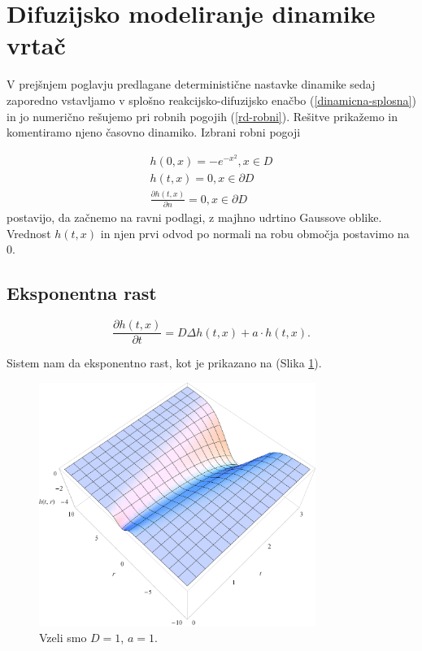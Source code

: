 \documentclass[a4paper, twoside, 12pt]{book}
\begin{document}
    \section{Difuzijsko modeliranje dinamike vrtač}

V prejšnjem poglavju predlagane deterministične nastavke dinamike sedaj zaporedno vstavljamo v splošno reakcijsko-difuzijsko enačbo (\ref{dinamicna-splosna}) in jo numerično rešujemo pri robnih pogojih (\ref{rd-robni}). Rešitve prikažemo in komentiramo njeno časovno dinamiko. Izbrani robni pogoji

    \begin{equation}
      \begin{aligned}
        h(0,x) =  - e^{-x^2}, x \in D \\
        h(t,x) = 0, x \in \partial D \\
        \frac{\partial h(t,x)}{\partial n} = 0, x \in \partial D
      \end{aligned}
\label{rd-robni}
    \end{equation}
postavijo, da začnemo na ravni podlagi, z majhno udrtino Gaussove oblike. Vrednost $h(t,x)$ in njen prvi odvod po normali na robu območja postavimo na $0$.

    \subsection{Eksponentna rast}

    \begin{equation}
      \frac{ \partial h(t,x) }{ \partial t} = D \Delta h(t,x) + a \cdot h(t,x).
      \label{difuzija-eksponentna-rast}
    \end{equation}

    Sistem nam da eksponentno rast, kot je prikazano na (Slika \ref{fig:difuzija-eksponentna-rast}).

    \begin{figure}[h!]
      \begin{center}
        \includegraphics[width=9cm]{slike/difuzija-eksponentna-rast2}
      \end{center}
      \caption{Vzeli smo $D=1$, $a=1$.}
      \label{fig:difuzija-eksponentna-rast}
    \end{figure}
\end{document}
